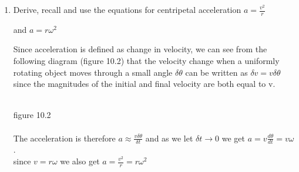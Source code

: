 \documentclass{article}
\begin{document}
\begin {enumerate}
Answer: First calculate the angular velocity of the Earth. It performs a complete orbit (ie $2\pi$ radians) in 1 year, so $\omega= \frac{2\pi}{365\times24\times3600}$

Then $v=r\omega$ = 30000 $ms^{-1}$
\\
\item Derive, recall and use the equations for centripetal acceleration $a = \frac{v ^{2}}{r}$

and $a = r\omega ^{2}$

Since acceleration is defined as change in velocity, we can see from the following diagram (figure 10.2) that the velocity change when a uniformly rotating object moves through a small angle $\delta\theta$ can be written as $\delta v = v\delta\theta$ since the magnitudes of the initial and final velocity are both equal to v.
\\
\\

\begin{figure}[h]
	\begin{center}
	\end{center}
\end{figure}



figure 10.2
\\
\\
The acceleration is therefore $a\approx\frac{v\delta\theta}{\delta t}$ and as we let $\delta t\rightarrow0$ we get $a=v\frac{d\theta}{dt}=v\omega$.
\\
since $v=r\omega$ we also get $a=\frac{v^2}{r}=r\omega^2$ 




\end{enumerate}
\end{document}
